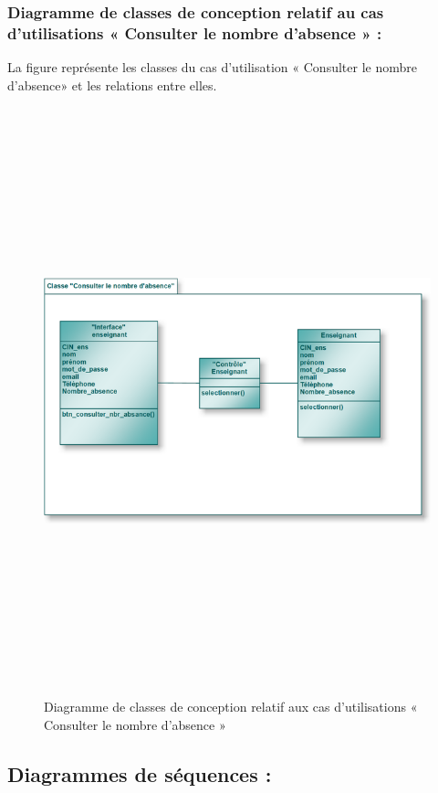 \documentclass[12 pt]{report}
\begin{document}
\subsubsection{Diagramme de classes de conception relatif au cas d'utilisations       « Consulter le nombre d'absence » :}
La figure  représente les classes du cas d’utilisation « Consulter le nombre d'absence» et les relations entre elles.
\begin{figure}[h]
 \begin{center}
\includegraphics[width= 18 cm ,height=  17cm]{cl_cna.PNG}
\caption{Diagramme de classes de conception relatif aux cas d'utilisations « Consulter le nombre d'absence » }

\end{center}
\end{figure}
\newpage
\subsection{Diagrammes de séquences :}
\end{document}
